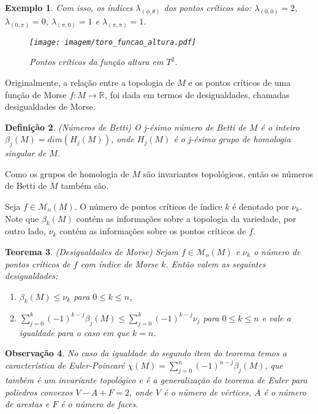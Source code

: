 \documentclass[12pt]{book}
\newtheorem{teorema}{Teorema}[section]
\newtheorem{definicao}[teorema]{Definição}
\newtheorem{exemplo}[teorema]{Exemplo}
\newtheorem{observacao}[teorema]{Observação}
\newcommand{\funcoesmorse}[1]{\mathcal{M}_{o}(#1)}
\newcommand{\real}[1]{\mathbb{R}^{#1}}
\newcommand{\reta}{\real{}}
\begin{document}
\begin{exemplo}
			Com isso, os índices $\lambda_{(\phi, \theta)}$ dos pontos críticos são: $\lambda_{(0,0)} = 2$, $\lambda_{(0,\pi)} = 0$, $\lambda_{(\pi,0)} = 1$ e $\lambda_{(\pi,\pi)} = 1$.
			
			\begin{figure}[!h]
				\centering
				\texttt{[image: imagem/toro\_funcao\_altura.pdf]}
				\caption{Pontos críticos da função altura em $T^{2}$.}
				\label{figura_toro_funcao_altura}
			\end{figure}
	\end{exemplo}

	Originalmente, a relação entre a topologia de $M$ e os pontos críticos de uma função de Morse $f:M \to \reta$, foi dada em termos de desigualdades, chamadas desigualdades de Morse.
	
	\begin{definicao}
		(Números de Betti) O j-ésimo número de Betti de $M$ é o inteiro $\beta_{j}(M) = dim(H_{j}(M))$, onde $H_{j}(M)$ é o j-ésimo grupo de homologia singular de $M$.
	\end{definicao}
	
	Como os grupos de homologia de $M$ são invariantes topológicos, então os números de Betti de $M$ também são.
	
	Seja $f \in \funcoesmorse{M}$. O número de pontos críticos de índice $k$ é denotado por $\nu_{k}$. Note que $\beta_{k}(M)$ contém as informações sobre a topologia da variedade, por outro lado, $\nu_{k}$ contém as informações sobre os pontos críticos de $f$.
	
	\begin{teorema}
		(Desigualdades de Morse) Sejam $f \in \funcoesmorse{M}$ e $\nu_{k}$ o número de pontos críticos de $f$ com índice de Morse $k$. Então valem as seguintes desigualdades:
		\begin{enumerate}
			\item $\beta_{k}(M) \leq \nu_{k}$ para $0\leq k\leq n$,
			
			\item $\sum_{j = 0}^{k}(-1)^{k-j}\beta_{j}(M) \leq \sum_{j = 0}^{k}(-1)^{k-j}\nu_{j} $ para $0 \leq k \leq n$ e vale a igualdade para o caso em que $k=n$.
		\end{enumerate}
	\end{teorema}
	
	\begin{observacao}
		No caso da igualdade do segundo item do teorema temos a característica de Euler-Poincaré $\chi(M) = \sum_{j = 0}^{n}(-1)^{n-j}\beta_{j}(M)$, que também é um invariante topológico e é a generalização do teorema de Euler para poliedros convexos $V-A+F = 2$, onde $V$ é o número de vértices, $A$ é o número de arestas e $F$ é o número de faces.
	\end{observacao}
	
\end{document}

